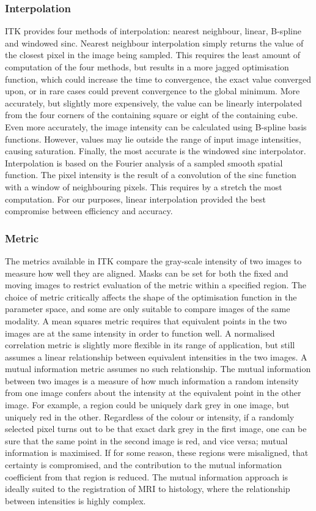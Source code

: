         \subsubsection{Interpolation} %
        \label{sub:interpolation}
          ITK provides four methods of interpolation: nearest neighbour, linear, B-spline and windowed sinc. Nearest neighbour interpolation simply returns the value of the closest pixel in the image being sampled. This requires the least amount of computation of the four methods, but results in a more jagged optimisation function, which could increase the time to convergence, the exact value converged upon, or in rare cases could prevent convergence to the global minimum. More accurately, but slightly more expensively, the value can be linearly interpolated from the four corners of the containing square or eight of the containing cube. Even more accurately, the image intensity can be calculated using B-spline basis functions. However, values may lie outside the range of input image intensities, causing saturation. Finally, the most accurate is the windowed sinc interpolator. Interpolation is based on the Fourier analysis of a sampled smooth spatial function. The pixel intensity is the result of a convolution of the sinc function with a window of neighbouring pixels. This requires by a stretch the most computation. For our purposes, linear interpolation provided the best compromise between efficiency and accuracy.

        \subsubsection{Metric} %
        \label{sub:metric}
          The metrics available in ITK compare the gray-scale intensity of two images to measure how well they are aligned. Masks can be set for both the fixed and moving images to restrict evaluation of the metric within a specified region. The choice of metric critically affects the shape of the optimisation function in the parameter space, and some are only suitable to compare images of the same modality. A mean squares metric requires that equivalent points in the two images are at the same intensity in order to function well. A normalised correlation metric is slightly more flexible in its range of application, but still assumes a linear relationship between equivalent intensities in the two images. A mutual information metric assumes no such relationship. The mutual information between two images is a measure of how much information a random intensity from one image confers about the intensity at the equivalent point in the other image. For example, a region could be uniquely dark grey in one image, but uniquely red in the other. Regardless of the colour or intensity, if a randomly selected pixel turns out to be that exact dark grey in the first image, one can be sure that the same point in the second image is red, and vice versa; mutual information is maximised. If for some reason, these regions were misaligned, that certainty is compromised, and the contribution to the mutual information coefficient from that region is reduced. The mutual information approach is ideally suited to the registration of MRI to histology, where the relationship between intensities is highly complex.


